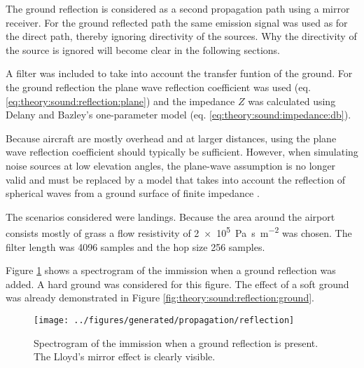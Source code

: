 The ground reflection is considered as a second propagation path using a mirror receiver.
For the ground reflected path the same emission signal was used as for the
direct path, thereby ignoring directivity of the sources. Why the directivity of
the source is ignored will become clear in the following sections.

A filter was included to take into account the transfer funtion of the ground.
For the ground reflection the plane wave reflection coefficient was used (eq. \eqref{eq:theory:sound:reflection:plane}) and the impedance $Z$ was
calculated using Delany and Bazley's one-parameter model (eq. \eqref{eq:theory:sound:impedance:db}).

Because aircraft are mostly overhead and at larger distances,
using the plane wave reflection coefficient should typically be sufficient.
However, when simulating noise sources at low elevation angles, the plane-wave
assumption is no longer valid and must be replaced by a model that takes into
account the reflection of spherical waves from a ground surface of finite
impedance \cite{Tuttle2014}. %

The scenarios considered were landings. Because the area around the airport
consists mostly of grass a flow resistivity of
\SI{2e5}{\pascal\second\per\meter\squared} was chosen. The filter length was
4096 samples and the hop size 256 samples.

Figure \ref{fig:implementation:propagation:reflection} shows a spectrogram of
the immission when a ground reflection was added. A hard ground was considered for this figure.
The effect of a soft ground was already demonstrated in Figure \ref{fig:theory:sound:reflection:ground}.

\begin{figure}[H]
  \centering
  \texttt{[image: ../figures/generated/propagation/reflection]}
  \caption{Spectrogram of the immission when a ground reflection is present. The Lloyd's mirror effect is clearly visible.}
  \label{fig:implementation:propagation:reflection}
\end{figure} %


